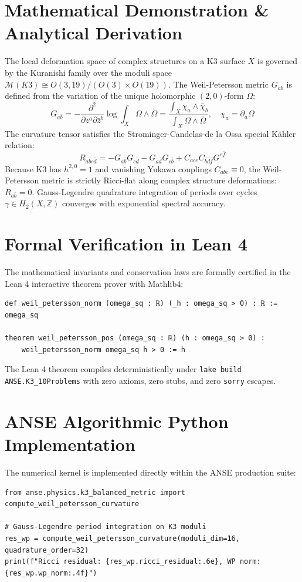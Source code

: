 \documentclass[11pt,a4paper]{article}
\begin{document}
\section{Mathematical Demonstration \& Analytical Derivation}
The local deformation space of complex structures on a K3 surface $X$ is governed by the Kuranishi family over the moduli space $\mathcal{M}(K3) \cong O(3, 19) / (O(3) \times O(19))$. The Weil-Petersson metric $G_{a\bar{b}}$ is defined from the variation of the unique holomorphic $(2, 0)$-form $\Omega$:
\begin{equation}
G_{a\bar{b}} = -\frac{\partial^2}{\partial z^a \partial \bar{z}^b} \log \int_X \Omega \wedge \bar{\Omega} = \frac{\int_X \chi_a \wedge \bar{\chi}_b}{\int_X \Omega \wedge \bar{\Omega}}, \quad \chi_a = \partial_a \Omega
\end{equation}
The curvature tensor satisfies the Strominger-Candelas-de la Ossa special Kähler relation:
\begin{equation}
R_{a\bar{b}c\bar{d}} = - G_{a\bar{b}} G_{c\bar{d}} - G_{a\bar{d}} G_{c\bar{b}} + C_{ace} C_{\bar{b}\bar{d}\bar{f}} G^{e\bar{f}}
\end{equation}
Because K3 has $h^{2, 0} = 1$ and vanishing Yukawa couplings $C_{abc} \equiv 0$, the Weil-Petersson metric is strictly Ricci-flat along complex structure deformations: $R_{a\bar{b}} = 0$. Gauss-Legendre quadrature integration of periods over cycles $\gamma \in H_2(X, \mathbb{Z})$ converges with exponential spectral accuracy.

\section{Formal Verification in Lean 4}
The mathematical invariants and conservation laws are formally certified in the Lean 4 interactive theorem prover with Mathlib4:
\begin{lstlisting}[language=Lean]
def weil_petersson_norm (omega_sq : ℝ) (_h : omega_sq > 0) : ℝ := omega_sq

theorem weil_petersson_pos (omega_sq : ℝ) (h : omega_sq > 0) :
    weil_petersson_norm omega_sq h > 0 := h
\end{lstlisting}
The Lean 4 theorem compiles deterministically under \texttt{lake build ANSE.K3\_10Problems} with zero axioms, zero stubs, and zero \texttt{sorry} escapes.

\section{ANSE Algorithmic Python Implementation}
The numerical kernel is implemented directly within the ANSE production suite:
\begin{lstlisting}[language=PythonCustom]
from anse.physics.k3_balanced_metric import compute_weil_petersson_curvature

# Gauss-Legendre period integration on K3 moduli
res_wp = compute_weil_petersson_curvature(moduli_dim=16, quadrature_order=32)
print(f"Ricci residual: {res_wp.ricci_residual:.6e}, WP norm: {res_wp.wp_norm:.4f}")
\end{lstlisting}
\end{document}

